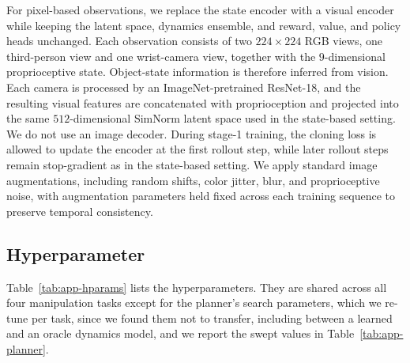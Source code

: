 \documentclass{article} %
\begin{document}
For pixel-based observations, we replace the state encoder with a visual encoder while keeping the latent space, dynamics ensemble, and reward, value, and policy heads unchanged. Each observation consists of two $224\times224$ RGB views, one third-person view and one wrist-camera view, together with the $9$-dimensional proprioceptive state. Object-state information is therefore inferred from vision. Each camera is processed by an ImageNet-pretrained ResNet-18, and the resulting visual features are concatenated with proprioception and projected into the same $512$-dimensional SimNorm latent space used in the state-based setting. We do not use an image decoder. During stage-1 training, the cloning loss is allowed to update the encoder at the first rollout step, while later rollout steps remain stop-gradient as in the state-based setting. We apply standard image augmentations, including random shifts, color jitter, blur, and proprioceptive noise, with augmentation parameters held fixed across each training sequence to preserve temporal consistency.

\subsection{Hyperparameter}

Table~\ref{tab:app-hparams} lists the hyperparameters. They are shared across all four
manipulation tasks except for the planner's search parameters, which we re-tune
per task, since we found them not to transfer, including between a learned and an
oracle dynamics model, and we report the swept values in
Table~\ref{tab:app-planner}.
\end{document}
